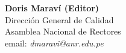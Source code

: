 \begin{center}
\textbf{Doris Maraví­ (Editor)} \\
Dirección General de Calidad \\
Asamblea Nacional de Rectores \\
email: \textit{dmaravi@anr.edu.pe} \\
\end{center}

